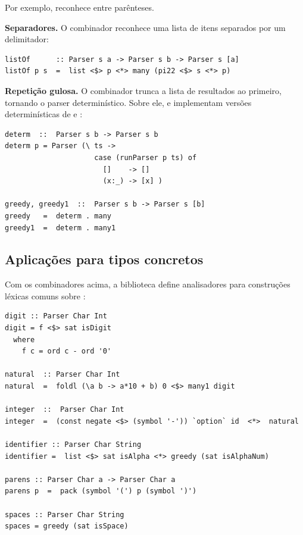 Por exemplo, 
reconhece  entre parênteses.

\textbf{Separadores.} O combinador 
reconhece uma lista de itens separados por um delimitador:

\begin{verbatim}
listOf      :: Parser s a -> Parser s b -> Parser s [a]
listOf p s  =  list <$> p <*> many (pi22 <$> s <*> p)
\end{verbatim}

\textbf{Repetição gulosa.} O combinador
 trunca a lista de resultados ao
primeiro, tornando o parser determinístico. Sobre ele,
 e 
implementam versões determinísticas de 
e :

\begin{verbatim}
determ  ::  Parser s b -> Parser s b
determ p = Parser (\ ts ->
                     case (runParser p ts) of
                       []    -> []
                       (x:_) -> [x] )

greedy, greedy1  ::  Parser s b -> Parser s [b]
greedy   =  determ . many
greedy1  =  determ . many1
\end{verbatim}

\subsection{Aplicações para tipos concretos}

Com os combinadores acima, a biblioteca define analisadores para
construções léxicas comuns sobre :

\begin{verbatim}
digit :: Parser Char Int
digit = f <$> sat isDigit
  where
    f c = ord c - ord '0'

natural  :: Parser Char Int
natural  =  foldl (\a b -> a*10 + b) 0 <$> many1 digit

integer  ::  Parser Char Int
integer  =  (const negate <$> (symbol '-')) `option` id  <*>  natural

identifier :: Parser Char String
identifier =  list <$> sat isAlpha <*> greedy (sat isAlphaNum)

parens :: Parser Char a -> Parser Char a
parens p  =  pack (symbol '(') p (symbol ')')

spaces :: Parser Char String
spaces = greedy (sat isSpace)
\end{verbatim}

